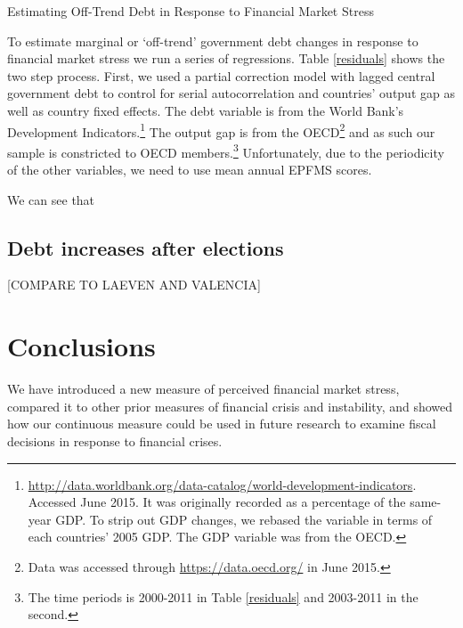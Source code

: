 \documentclass[]{article}
\begin{document}
\begin{table}
    \caption{Estimating Off-Trend Debt in Response to Financial Market Stress}
    \label{residuals}
        \begin{center}
            
        \end{center}
\end{table}

To estimate marginal or `off-trend' government debt changes in response to financial market stress we run a series of regressions. Table \ref{residuals} shows the two step process. First, we used a partial correction model with lagged central government debt to control for serial autocorrelation and countries' output gap as well as country fixed effects. The debt variable is from the World Bank's Development Indicators.\footnote{\url{http://data.worldbank.org/data-catalog/world-development-indicators}. Accessed June 2015. It was originally recorded as a percentage of the same-year GDP. To strip out GDP changes, we rebased the variable in terms of each countries' 2005 GDP. The GDP variable was from the OECD.} The output gap is from the OECD\footnote{Data was accessed through \url{https://data.oecd.org/} in June 2015.} and as such our sample is constricted to OECD members.\footnote{The time periods is 2000-2011 in Table \ref{residuals} and 2003-2011 in the second.} Unfortunately, due to the periodicity of the other variables, we need to use mean annual EPFMS scores.

We can see that 



\subsection{Debt increases after elections}

[COMPARE TO LAEVEN AND VALENCIA]


\section{Conclusions}\label{conclusions}

We have introduced a new measure of perceived financial market stress, compared it to other prior measures of financial crisis and instability, and showed how our continuous measure could be used in future research to examine fiscal decisions in response to financial crises.



\end{document}

